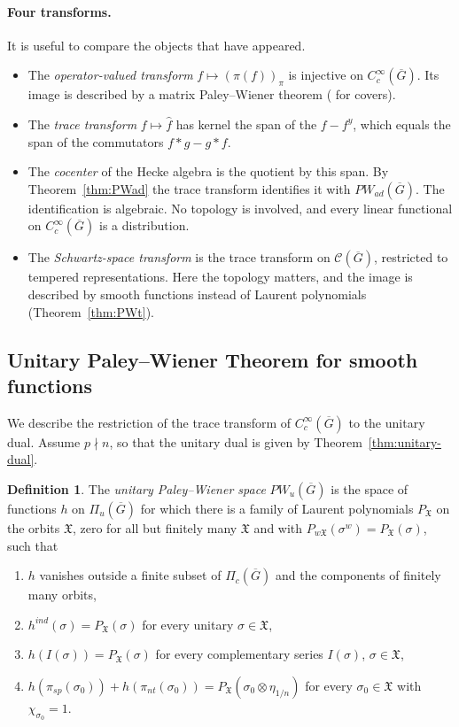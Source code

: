 \documentclass[12pt,letterpaper]{article}
\numberwithin{equation}{section}
\theoremstyle{definition}
\newtheorem{xdefinition}[theorem]{Definition}
\newcommand{\bG}{\overline{G}}
\newcommand{\calC}{\mathcal C}
\newcommand{\fX}{\mathfrak X}
\newcommand{\Piu}{\Pi_{u}(\bG)}
\begin{document}
\paragraph{Four transforms.}  It is useful to compare the objects that have appeared.
\begin{itemize}[leftmargin=*,itemsep=1pt]
\item The \emph{operator-valued transform} $f\mapsto(\pi(f))_\pi$ is injective on
$C_c^\infty(\bG)$.  Its image is described by a matrix Paley--Wiener theorem
(\cite[Appendix~A]{He25} for covers).
\item The \emph{trace transform} $f\mapsto\hat f$ has kernel the span of the $f-f^y$, which
equals the span of the commutators $f*g-g*f$.
\item The \emph{cocenter} of the Hecke algebra is the quotient by this span.  By
Theorem~\ref{thm:PWad} the trace transform identifies it with $PW_{ad}(\bG)$.  The
identification is algebraic.  No topology is involved, and every linear functional on
$C_c^\infty(\bG)$ is a distribution.
\item The \emph{Schwartz-space transform} is the trace transform on $\calC(\bG)$,
restricted to tempered representations.  Here the topology matters, and the image is
described by smooth functions instead of Laurent polynomials (Theorem~\ref{thm:PWt}).
\end{itemize}

\subsection{Unitary Paley--Wiener Theorem for smooth functions}\label{subsec:PWu}

We describe the restriction of the trace transform of $C_c^\infty(\bG)$ to the unitary
dual.  Assume $p\nmid n$, so that the unitary dual is given by
Theorem~\ref{thm:unitary-dual}.

\begin{xdefinition}\label{def:PWu}
The \emph{unitary Paley--Wiener space} $PW_u(\bG)$ is the space of functions $h$ on $\Piu$
for which there is a family of Laurent polynomials $P_{\fX}$ on the orbits $\fX$, zero for
all but finitely many $\fX$ and with $P_{w\fX}(\sigma^w)=P_{\fX}(\sigma)$, such that
\begin{enumerate}[label=(U\arabic*),leftmargin=*,itemsep=1pt]
\item $h$ vanishes outside a finite subset of $\Pi_c(\bG)$ and the components of finitely
many orbits,
\item $h^{ind}(\sigma)=P_{\fX}(\sigma)$ for every unitary $\sigma\in\fX$,
\item $h(I(\sigma))=P_{\fX}(\sigma)$ for every complementary series $I(\sigma)$, $\sigma\in\fX$,
\item $h(\pi_{sp}(\sigma_0))+h(\pi_{nt}(\sigma_0))=P_{\fX}(\sigma_0\otimes\eta_{1/n})$ for every
$\sigma_0\in\fX$ with $\chi_{\sigma_0}=1$.
\end{enumerate}
\end{xdefinition}
\end{document}
